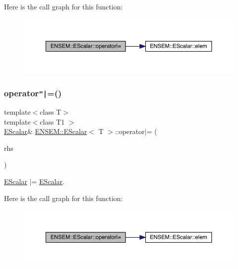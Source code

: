 Here is the call graph for this function\+:
\nopagebreak
\begin{figure}[H]
\begin{center}
\leavevmode
\includegraphics[width=350pt]{d0/d82/classENSEM_1_1EScalar_a95469ba3db6456ae2fa0c6d86d082c0a_cgraph}
\end{center}
\end{figure}
\mbox{\label{classENSEM_1_1EScalar_a95469ba3db6456ae2fa0c6d86d082c0a}} 
\subsubsection{\texorpdfstring{operator\texttt{"|}=()}{operator|=()}\hspace{0.1cm}{\footnotesize\ttfamily [3/3]}}
{\footnotesize\ttfamily template$<$class T$>$ \\
template$<$class T1 $>$ \\
\mbox{\hyperlink{classENSEM_1_1EScalar}{E\+Scalar}}\& \mbox{\hyperlink{classENSEM_1_1EScalar}{E\+N\+S\+E\+M\+::\+E\+Scalar}}$<$ T $>$\+::operator$\vert$= (\begin{DoxyParamCaption}\item[{const \mbox{\hyperlink{classENSEM_1_1EScalar}{E\+Scalar}}$<$ T1 $>$ \&}]{rhs }\end{DoxyParamCaption})\hspace{0.3cm}{\ttfamily [inline]}}



\mbox{\hyperlink{classENSEM_1_1EScalar}{E\+Scalar}} $\vert$= \mbox{\hyperlink{classENSEM_1_1EScalar}{E\+Scalar}}. 

Here is the call graph for this function\+:
\nopagebreak
\begin{figure}[H]
\begin{center}
\leavevmode
\includegraphics[width=350pt]{d0/d82/classENSEM_1_1EScalar_a95469ba3db6456ae2fa0c6d86d082c0a_cgraph}
\end{center}
\end{figure}
\mbox{\label{classENSEM_1_1EScalar_aff8eff3acd3686a6ae0b1a1a0dfd6426}} 

